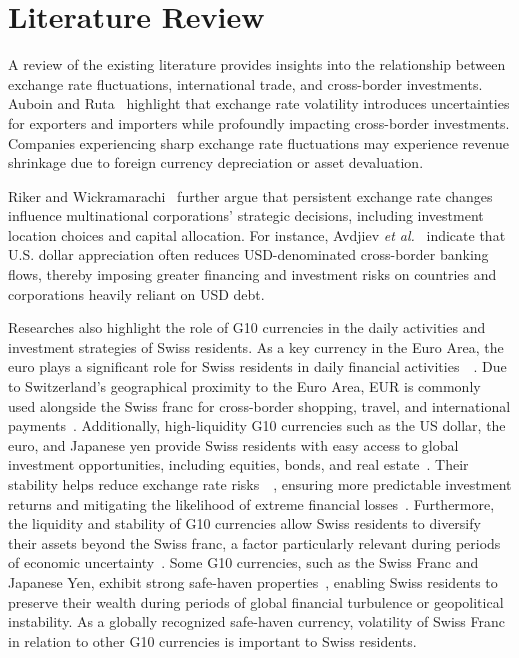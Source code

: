 \documentclass[a4paper, 12pt]{article}
\begin{document}
\section{Literature Review}
A review of the existing literature provides insights into the relationship between exchange rate fluctuations, international trade, and cross-border investments. Auboin and Ruta~\cite{AUBOIN_RUTA_2013} highlight that exchange rate volatility introduces uncertainties for exporters and importers while profoundly impacting cross-border investments. Companies experiencing sharp exchange rate fluctuations may experience revenue shrinkage due to foreign currency depreciation or asset devaluation.

Riker and Wickramarachi~\cite{riker2020review} further argue that persistent exchange rate changes influence multinational corporations' strategic decisions, including investment location choices and capital allocation. For instance, Avdjiev \textit{et al.}~\cite{dollar_exchange} indicate that U.S. dollar appreciation often reduces USD-denominated cross-border banking flows, thereby imposing greater financing and investment risks on countries and corporations heavily reliant on USD debt.

Researches also highlight the role of G10 currencies in the daily activities and investment strategies of Swiss residents. As a key currency in the Euro Area, the euro plays a significant role for Swiss residents in daily financial activities~\cite{engel2016exchange}~\cite{goulferni2023switzerland}. Due to Switzerland's geographical proximity to the Euro Area, EUR is commonly used alongside the Swiss franc for cross-border shopping, travel, and international payments~\cite{sif_imf_reports}. Additionally, high-liquidity G10 currencies such as the US dollar, the euro, and Japanese yen provide Swiss residents with easy access to global investment opportunities, including equities, bonds, and real estate~\cite{rogoff2000six}. Their stability helps reduce exchange rate risks~\cite{campbell2002strategic}~\cite{engel2016exchange}, ensuring more predictable investment returns and mitigating the likelihood of extreme financial losses~\cite{de1998big}. Furthermore, the liquidity and stability of G10 currencies allow Swiss residents to diversify their assets beyond the Swiss franc, a factor particularly relevant during periods of economic uncertainty~\cite{ito2020currency}. Some G10 currencies, such as the Swiss Franc and Japanese Yen, exhibit strong safe-haven properties~\cite{ranaldo2010safe}, enabling Swiss residents to preserve their wealth during periods of global financial turbulence or geopolitical instability. As a globally recognized safe-haven currency, volatility of Swiss Franc in relation to other G10 currencies is important to Swiss residents.
\end{document}

